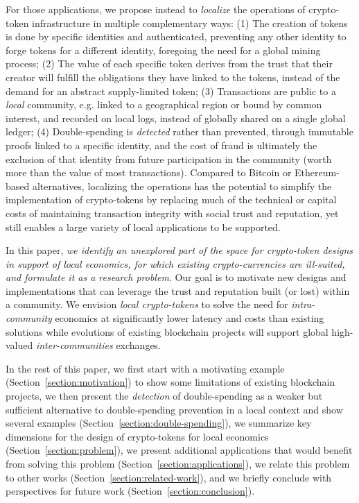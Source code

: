 \documentclass[sigplan,screen,10pt]{acmart}
\begin{document}
For those applications, we propose instead to \textit{localize} the operations of crypto-token infrastructure in multiple complementary ways: (1) The creation of tokens is done by specific identities and authenticated, preventing any other identity to forge tokens for a different identity, foregoing the need for a global mining process; (2) The value of each specific token derives from the trust that their creator will fulfill the obligations they have linked to the tokens, instead of the demand for an abstract supply-limited token; (3) Transactions are public to a \textit{local} community, e.g. linked to a geographical region or bound by common interest, and recorded on local logs, instead of globally shared on a single global ledger; (4) Double-spending is \textit{detected} rather than prevented, through immutable proofs linked to a specific identity, and the cost of fraud is ultimately the exclusion of that identity from future participation in the community (worth more than the value of most transactions). Compared to Bitcoin or Ethereum-based alternatives, localizing the operations has the potential to simplify the implementation of crypto-tokens by replacing much of the technical or capital costs of maintaining transaction integrity with social trust and reputation, yet still enables a large variety of local applications to be supported.

In this paper, \textit{we identify an unexplored part of the space for crypto-token designs in support of local economics, for which existing crypto-currencies are ill-suited, and formulate it as a research problem}. Our goal is to motivate new designs and implementations that can leverage the trust and reputation built (or lost) within a community. We envision \textit{local crypto-tokens} to solve the need for \textit{intra-community} economics at significantly lower latency and costs than existing solutions while evolutions of existing blockchain projects will support global high-valued \textit{inter-communities} exchanges.

In the rest of this paper, we first start with a motivating example (Section~\ref{section:motivation}) to show some limitations of existing blockchain projects, we then present the \textit{detection} of double-spending as a weaker but sufficient alternative to double-spending prevention in a local context and show several examples (Section~\ref{section:double-spending}), we summarize key dimensions for the design of crypto-tokens for local economics (Section~\ref{section:problem}), we present additional applications that would benefit from solving this problem (Section~\ref{section:applications}), we relate this problem to other works (Section~\ref{section:related-work}), and we briefly conclude with perspectives for future work (Section~\ref{section:conclusion}).
\end{document}
